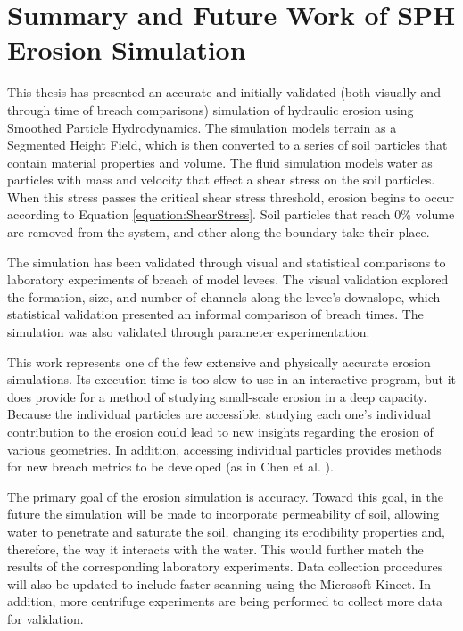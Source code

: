 \section{Summary and Future Work of SPH Erosion Simulation}
\label{section:SPHErosionSimulationSummary}

This thesis has presented an accurate and initially validated (both visually and through time of breach comparisons) simulation of hydraulic erosion using Smoothed Particle Hydrodynamics. The simulation models terrain as a Segmented Height Field, which is then converted to a series of soil particles that contain material properties and volume. The fluid simulation models water as particles with mass and velocity that effect a shear stress on the soil particles. When this stress passes the critical shear stress threshold, erosion begins to occur according to Equation \ref{equation:ShearStress}. Soil particles that reach 0\% volume are removed from the system, and other along the boundary take their place.

The simulation has been validated through visual and statistical comparisons to laboratory experiments of breach of model levees. The visual validation explored the formation, size, and number of channels along the levee's downslope, which statistical validation presented an informal comparison of breach times. The simulation was also validated through parameter experimentation.

This work represents one of the few extensive and physically accurate erosion simulations. Its execution time is too slow to use in an interactive program, but it does provide for a method of studying small-scale erosion in a deep capacity. Because the individual particles are accessible, studying each one's individual contribution to the erosion could lead to new insights regarding the erosion of various geometries. In addition, accessing individual particles provides methods for new breach metrics to be developed (as in Chen et al. \cite{Chen:2010:QAS:1869790.1869867}). 


The primary goal of the erosion simulation 
is accuracy. Toward this goal, in the future the simulation will be made to incorporate permeability of soil, allowing water to penetrate and saturate the soil, changing its erodibility properties and, therefore, the way it interacts with the water. This would further match the results of the corresponding laboratory experiments.
% 
Data collection procedures will also be updated to include faster scanning using the Microsoft Kinect. In addition, more centrifuge experiments are being performed to collect more data for validation.
